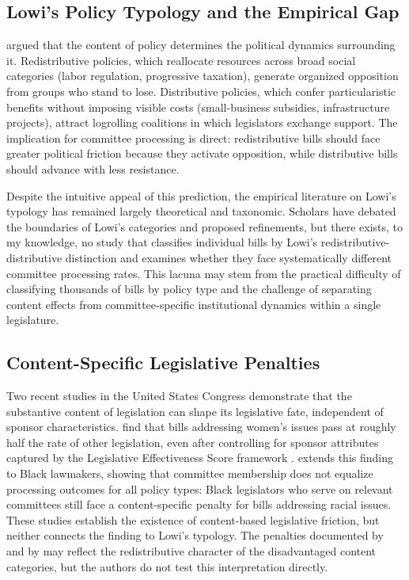 \documentclass[11pt]{article}
\begin{document}
\subsection{Lowi's Policy Typology and the Empirical Gap}
\label{sec:lit-lowi}

\citet{lowi1964} argued that the content of policy determines the political dynamics surrounding it. Redistributive policies, which reallocate resources across broad social categories (labor regulation, progressive taxation), generate organized opposition from groups who stand to lose. Distributive policies, which confer particularistic benefits without imposing visible costs (small-business subsidies, infrastructure projects), attract logrolling coalitions in which legislators exchange support. The implication for committee processing is direct: redistributive bills should face greater political friction because they activate opposition, while distributive bills should advance with less resistance.

Despite the intuitive appeal of this prediction, the empirical literature on Lowi's typology has remained largely theoretical and taxonomic. Scholars have debated the boundaries of Lowi's categories and proposed refinements, but there exists, to my knowledge, no study that classifies individual bills by Lowi's redistributive-distributive distinction and examines whether they face systematically different committee processing rates. This lacuna may stem from the practical difficulty of classifying thousands of bills by policy type and the challenge of separating content effects from committee-specific institutional dynamics within a single legislature.

\subsection{Content-Specific Legislative Penalties}
\label{sec:lit-content}

Two recent studies in the United States Congress demonstrate that the substantive content of legislation can shape its legislative fate, independent of sponsor characteristics. \citet{volden2016} find that bills addressing women's issues pass at roughly half the rate of other legislation, even after controlling for sponsor attributes captured by the Legislative Effectiveness Score framework \citep{volden2014}. \citet{peay2020} extends this finding to Black lawmakers, showing that committee membership does not equalize processing outcomes for all policy types: Black legislators who serve on relevant committees still face a content-specific penalty for bills addressing racial issues. These studies establish the existence of content-based legislative friction, but neither connects the finding to Lowi's typology. The penalties documented by \citeauthor{volden2016} and by \citeauthor{peay2020} may reflect the redistributive character of the disadvantaged content categories, but the authors do not test this interpretation directly.
\end{document}
